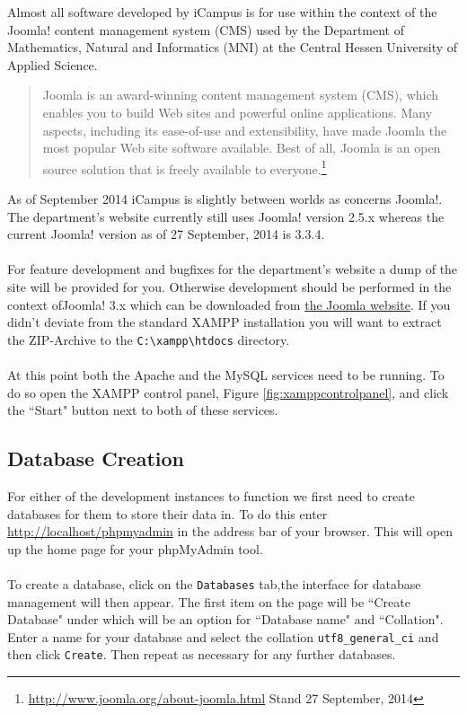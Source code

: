 \documentclass[]{report}
\begin{document}
Almost all software developed by iCampus is for use within the context of the Joomla! content management system (CMS) used by the Department of Mathematics, Natural and Informatics (MNI) at the Central Hessen University of Applied Science.

\begin{quote}
	Joomla is an award-winning content management system (CMS), which enables you to build Web sites and powerful online applications. Many aspects, including its ease-of-use and extensibility, have made Joomla the most popular Web site software available. Best of all, Joomla is an open source solution that is freely available to everyone.\footnote{\url{http://www.joomla.org/about-joomla.html} Stand 27 September, 2014}
\end{quote}

\noindent
As of September 2014 iCampus is slightly between worlds as concerns Joomla!. The department's website currently still uses Joomla! version 2.5.x whereas the current Joomla! version as of 27 September, 2014 is 3.3.4.\\
\\
For feature development and bugfixes for the department's website a dump of the site will be provided for you. Otherwise development should be performed in the context ofJoomla! 3.x which can be downloaded from \href{http://www.joomla.org/download.html}{the Joomla website}. If you didn't deviate from the standard XAMPP installation you will want to extract the ZIP-Archive to the \texttt{C:\textbackslash xampp\textbackslash htdocs} directory.\\ 
\\
At this point both the Apache and the MySQL services need to be running. To do so open the XAMPP control panel, Figure \ref{fig:xamppcontrolpanel}, and click the ``Start" button next to both of these services.

\subsection{Database Creation}

For either of the development instances to function we first need to create databases for them to store their data in. To do this enter \url{http://localhost/phpmyadmin} in the address bar of your browser. This will open up the home page for your phpMyAdmin tool.\\
\\
To create a database, click on the \texttt{Databases} tab,the interface for database management will then appear. The first item on the page will be ``Create Database" under which will be an option for ``Database name" and ``Collation". Enter a name for your database and select the collation \texttt{utf8\_general\_ci} and then click \texttt{Create}. Then repeat as necessary for any further databases.\\
\end{document}
